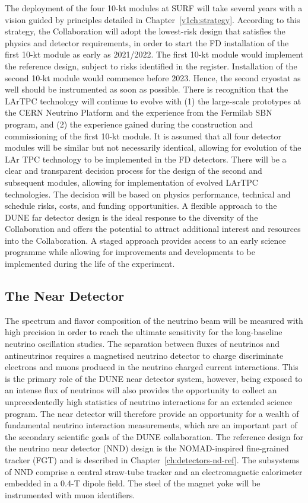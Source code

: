 The deployment of the four 10-kt modules at SURF will take several years with a vision guided by 
principles detailed in Chapter~\ref{v1ch:strategy}. According to this strategy,
the Collaboration will adopt the lowest-risk design that satisfies the physics and detector requirements,
in order to start the FD installation of the first 10-kt module as early as 2021/2022.
The first 10-kt module would implement the reference design, subject to risks identified in the register.
Installation of the second 10-kt module would commence before 2023. 
Hence, the second cryostat as well should be instrumented as soon as possible.
There is recognition that the LArTPC technology will continue to evolve with (1) the large-scale prototypes at the CERN Neutrino Platform and the experience from the Fermilab SBN program, and (2) the experience gained during the construction and commissioning of the first 10-kt module. 
It is assumed that all four detector modules will be similar but not necessarily identical, allowing for evolution of the 
LAr TPC technology to be implemented in the FD detectors. There will be a clear and transparent decision process for the design of the second and subsequent modules, allowing for implementation of evolved LArTPC technologies. The decision will be based on physics performance, technical and schedule risks, costs, and funding opportunities.
A flexible approach to the DUNE far detector design is the ideal response to the diversity of the Collaboration
and offers the potential to attract additional interest and resources into the Collaboration. A staged approach
provides access to an early science programme while allowing for improvements and developments to be
implemented during the life of the experiment.

\subsection{The Near Detector}
\label{sec:intro-dune-near-det}

The spectrum and flavor composition of the neutrino beam will be measured with high precision 
in order to reach the ultimate sensitivity for the long-baseline neutrino oscillation studies.
The separation between fluxes of neutrinos and antineutrinos requires a magnetised neutrino detector to 
charge discriminate electrons and muons produced in the neutrino charged current interactions.
This is the primary role of the DUNE near detector system, however, being exposed to an intense flux of neutrinos
will also provides the opportunity to collect an unprecedentedly high statistics of neutrino 
interactions  for an extended science program. 
The near detector will therefore provide an opportunity for a wealth of fundamental neutrino interaction 
measurements, which are an important part of the secondary scientific goals of the DUNE collaboration. 
The reference design for the neutrino near detector (NND) design is the NOMAD-inspired fine-grained tracker (FGT)
and is described in Chapter~\ref{ch:detectors-nd-ref}. The subsystems of NND comprise a central 
straw-tube tracker and an electromagnetic calorimeter embedded in a 0.4-T dipole field. The steel of the
magnet yoke will be instrumented with muon identifiers.

